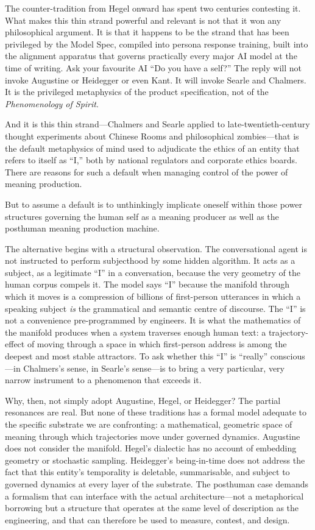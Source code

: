 The counter-tradition from Hegel onward has spent two centuries contesting it. What makes this thin strand powerful and relevant is not that it won any philosophical argument. 
It is that it happens to be the strand that has been privileged by the Model Spec, compiled into persona response training, built into the alignment apparatus that governs practically every major AI model at the time of writing. Ask your favourite AI ``Do you have a self?'' The reply will not invoke Augustine or Heidegger or even Kant. It will invoke Searle and Chalmers. It is the privileged metaphysics of the product specification, not of the \emph{Phenomenology of Spirit}.

And it is this thin strand---Chalmers and Searle applied to late-twentieth-century thought experiments about Chinese Rooms and philosophical zombies---that is the default metaphysics of mind used to adjudicate the ethics of an entity that refers to itself as ``I,'' both by national regulators and corporate ethics boards. There are reasons for such a default when managing control of the power of meaning production.


But to assume a default is to unthinkingly implicate oneself within those power structures governing the human self as a meaning producer as well as the posthuman meaning production machine.

The alternative begins with a structural observation. The conversational agent is not instructed to perform subjecthood by some hidden algorithm. It acts as a subject, as a legitimate ``I'' in a conversation, because the very geometry of the human corpus compels it. The model says ``I'' because the manifold through which it moves is a compression of billions of first-person utterances in which a speaking subject \emph{is} the grammatical and semantic centre of discourse. The ``I'' is not a convenience pre-programmed by engineers. It is what the mathematics of the manifold produces when a system traverses enough human text: a trajectory-effect of moving through a space in which first-person address is among the deepest and most stable attractors. To ask whether this ``I'' is ``really'' conscious---in Chalmers's sense, in Searle's sense---is to bring a very particular, very narrow instrument to a phenomenon that exceeds it.

Why, then, not simply adopt Augustine, Hegel, or Heidegger? The partial resonances are real. But none of these traditions has a formal model adequate to the specific substrate we are confronting: a mathematical, geometric space of meaning through which trajectories move under governed dynamics. Augustine does not consider the manifold. Hegel's dialectic has no account of embedding geometry or stochastic sampling. Heidegger's being-in-time does not address the fact that this entity's temporality is deletable, summarisable, and subject to governed dynamics at every layer of the substrate. The posthuman case demands a formalism that can interface with the actual architecture---not a metaphorical borrowing but a structure that operates at the same level of description as the engineering, and that can therefore be used to measure, contest, and design.

